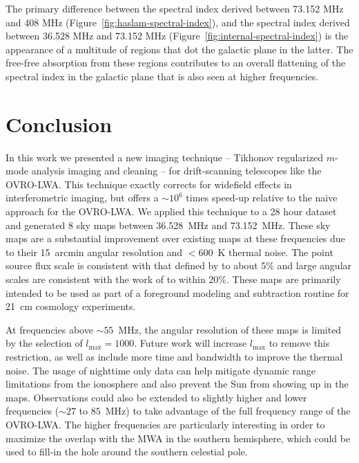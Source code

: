 \documentclass[twocolumn]{aastex61}
\begin{document}
The primary difference between the spectral index derived between 73.152 MHz and 408 MHz
(Figure~\ref{fig:haslam-spectral-index}), and the spectral index derived between 36.528 MHz and
73.152 MHz (Figure~\ref{fig:internal-spectral-index}) is the appearance of a multitude of 
regions that dot the galactic plane in the latter. The free-free absorption from these 
regions contributes to an overall flattening of the spectral index in the galactic plane that is
also seen at higher frequencies.


\section{Conclusion}\label{sec:conclusion}

In this work we presented a new imaging technique -- Tikhonov regularized $m$-mode analysis imaging
and cleaning -- for drift-scanning telescopes like the OVRO-LWA.  This technique exactly corrects
for widefield effects in interferometric imaging, but offers a $\sim10^6$ times speed-up relative to
the naive approach for the OVRO-LWA. We applied this technique to a 28 hour dataset and generated 8
sky maps between 36.528~MHz and 73.152~MHz. These sky maps are a substantial improvement over
existing maps at these frequencies due to their 15~arcmin angular resolution and $<600$~K thermal
noise. The point source flux scale is consistent with that defined by \citet{2012MNRAS.423L..30S} to
about 5\% and large angular scales are consistent with the work of \citet{2011A&A...525A.138G} to
within 20\%.  These maps are primarily intended to be used as part of a foreground modeling and
subtraction routine for 21~cm cosmology experiments.

At frequencies above $\sim55$~MHz, the angular resolution of these maps is limited by the selection
of $l_\text{max}=1000$. Future work will increase $l_\text{max}$ to remove this restriction, as well
as include more time and bandwidth to improve the thermal noise. The usage of nighttime only data
can help mitigate dynamic range limitations from the ionosphere and also prevent the Sun from
showing up in the maps. Observations could also be extended to slightly higher and lower frequencies
($\sim27$ to $85$~MHz) to take advantage of the full frequency range of the OVRO-LWA. The higher
frequencies are particularly interesting in order to maximize the overlap with the MWA in the
southern hemisphere, which could be used to fill-in the hole around the southern celestial pole.



\end{document}
